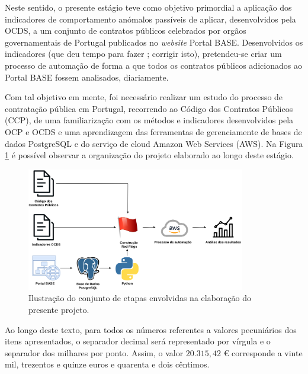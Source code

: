 Neste sentido, o presente estágio teve como objetivo primordial a aplicação dos indicadores de comportamento anómalos passíveis de aplicar, desenvolvidos pela OCDS, a um conjunto de contratos públicos celebrados por orgãos governamentais de Portugal publicados no \textit{website} Portal BASE. Desenvolvidos os indicadores (que deu tempo para fazer ; corrigir isto), pretendeu-se criar um processo de automação de forma a que todos os contratos públicos adicionados ao Portal BASE fossem analisados, diariamente.

Com tal objetivo em mente, foi necessário realizar um estudo do processo de contratação pública em Portugal, recorrendo ao Código dos Contratos Públicos (CCP), de uma familiarização com os métodos e indicadores desenvolvidos pela OCP e OCDS e uma aprendizagem das ferramentas de gerenciamente de bases de dados PostgreSQL e do serviço de cloud Amazon Web Services (AWS). Na Figura \ref{fig:processo} é possível observar a organização do projeto elaborado ao longo deste estágio. 


\begin{figure}[H]
	\centering
	\includegraphics[width=0.85\textwidth]{imagens/processo_tese.png}
	\caption{Ilustração do conjunto de etapas envolvidas na elaboração do presente projeto. }
	\label{fig:processo}
\end{figure}

Ao longo deste texto, para todos os números referentes a valores pecuniários dos itens apresentados, o separador decimal será representado por vírgula e o separador dos milhares por ponto. Assim, o valor $20.315,42$ € corresponde a vinte mil, trezentos e quinze euros e quarenta e dois cêntimos. 

